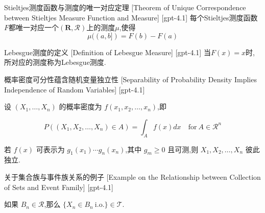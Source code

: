 \documentclass[UTF8]{ctexart}
\begin{document}
    
    
    \begin{thm}
        {Stieltjes测度函数与测度的唯一对应定理}
        [Theorem of Unique Correspondence between Stieltjes Measure Function and Measure]
        [gpt-4.1]
        每个Stieltjes测度函数$F$都唯一对应一个$(\mathbf{R}, \mathcal{R})$上的测度$\mu$,使得
\[
\mu((a, b]) = F(b) - F(a)
\]

    \end{thm}
    
    
    
    \begin{dfn}
        {Lebesgue测度的定义}
        [Definition of Lebesgue Measure]
        [gpt-4.1]
        当$F(x) = x$时,所对应的测度称为Lebesgue测度.

    \end{dfn}
    
    
    
    \begin{thm}
        {概率密度可分性蕴含随机变量独立性}
        [Separability of Probability Density Implies Independence of Random Variables]
        [gpt-4.1]
        
设 $(X_{1}, \ldots, X_{n})$ 的概率密度为 $f(x_{1}, x_{2}, \ldots, x_{n})$,即

\[
P((X_{1}, X_{2}, \ldots, X_{n}) \in A) = \int_{A} f(x) dx \quad \mathrm{for} \ A \in {\mathcal{R}}^{n}
\]

若 $f(x)$ 可表示为 $g_{1}(x_{1}) \cdots g_{n}(x_{n})$,其中 $g_{m} \geq 0$ 且可测,则 $X_{1}, X_{2}, \ldots, X_{n}$ 彼此独立.

    \end{thm}
    
    
    
    \begin{xmp}
        {关于集合族与事件族关系的例子}
        [Example on the Relationship between Collection of Sets and Event Family]
        [gpt-4.1]
        
如果 $B_n \in \mathcal{R}$,那么 $\{ X_n \in B_n~\text{i.o.} \} \in \mathcal{T}$.

    \end{xmp}
    
    
    
\end{document}
